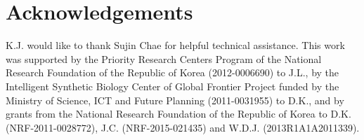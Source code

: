 \section*{Acknowledgements}

K.J. would like to thank Sujin Chae for helpful technical assistance. This work was supported by the Priority Research Centers Program of the National Research Foundation of the Republic of Korea (2012-0006690) to J.L., by the Intelligent Synthetic Biology Center of Global Frontier Project funded by the Ministry of Science, ICT and Future Planning (2011-0031955) to D.K., and by grants from the National Research Foundation of the Republic of Korea to D.K. (NRF-2011-0028772), J.C. (NRF-2015-021435) and W.D.J. (2013R1A1A2011339).
